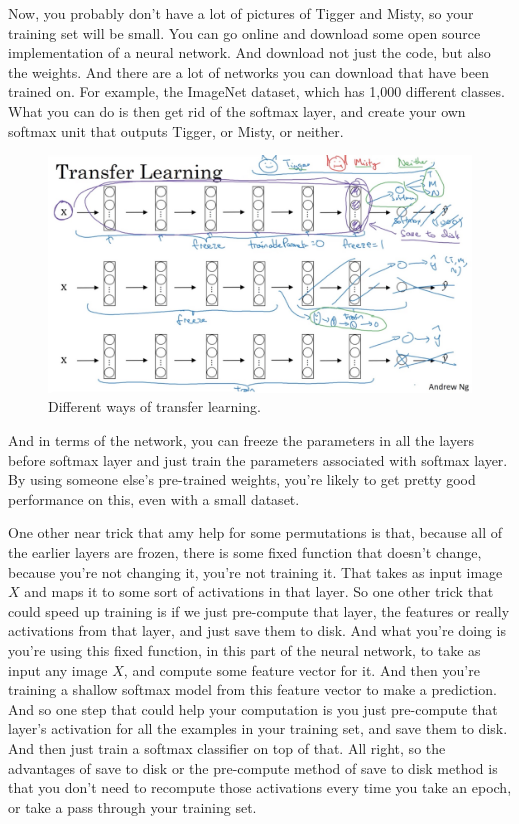 \documentclass[UTF8]{article}
\begin{document}
Now, you probably don't have a lot of pictures of Tigger and Misty, so your training set will be
small. You can go online and download some open source implementation of a neural network. And
download not just the code, but also the weights. And there are a lot of networks you can download
that have been trained on. For example, the ImageNet dataset, which has 1,000 different classes.
What you can do is then get rid of the softmax layer, and create your own softmax unit that outputs
Tigger, or Misty, or neither.

\begin{figure}[htb]
    \centering
    \includegraphics[width=40em]{figures/transfer-learning}
    \caption{Different ways of transfer learning.}
    \label{fig:transfer-learning}
\end{figure}

And in terms of the network, you can freeze the parameters in all the layers before softmax layer
and just train the parameters associated with softmax layer. By using someone else's pre-trained
weights, you're likely to get pretty good performance on this, even with a small dataset.

One other near trick that amy help for some permutations is that, because all of the earlier layers
are frozen, there is some fixed function that doesn't change, because you're not changing it,
you're not training it. That takes as input image $X$ and maps it to some sort of activations in
that layer. So one other trick that could speed up training is if we just pre-compute that layer,
the features or really activations from that layer, and just save them to disk. And what you're
doing is you're using this fixed function, in this part of the neural network, to take as input any
image $X$, and compute some feature vector for it. And then you're training a shallow softmax model
from this feature vector to make a prediction. And so one step that could help your computation is
you just pre-compute that layer's activation for all the examples in your training set, and save
them to disk. And then just train a softmax classifier on top of that. All right, so the advantages
of save to disk or the pre-compute method of save to disk method is that you don't need to recompute
those activations every time you take an epoch, or take a pass through your training set.
\end{document}
